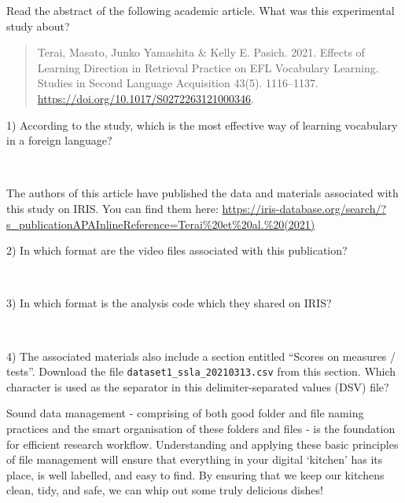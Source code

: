 \documentclass[
  letterpaper,
  DIV=11,
  numbers=noendperiod]{scrreprt}
\begin{document}
\begin{tcolorbox}[enhanced jigsaw, colback=white, colframe=quarto-callout-caution-color-frame, coltitle=black, toprule=.15mm, bottomtitle=1mm, arc=.35mm, left=2mm, opacityback=0, leftrule=.75mm, toptitle=1mm, titlerule=0mm, title=\textcolor{quarto-callout-caution-color}{\faFire}\hspace{0.5em}{Task}, opacitybacktitle=0.6, bottomrule=.15mm, colbacktitle=quarto-callout-caution-color!10!white, rightrule=.15mm, breakable]

Read the abstract of the following academic article. What was this
experimental study about?

\begin{quote}
Terai, Masato, Junko Yamashita \& Kelly E. Pasich. 2021. Effects of
Learning Direction in Retrieval Practice on EFL Vocabulary Learning.
Studies in Second Language Acquisition 43(5). 1116--1137.
\url{https://doi.org/10.1017/S0272263121000346}.
\end{quote}

1) According to the study, which is the most effective way of learning
vocabulary in a foreign language?

~

The authors of this article have published the data and materials
associated with this study on IRIS. You can find them here:
\url{https://iris-database.org/search/?s_publicationAPAInlineReference=Terai\%20et\%20al.\%20(2021)}

2) In which format are the video files associated with this publication?

~

3) In which format is the analysis code which they shared on IRIS?

~

4) The associated materials also include a section entitled ``Scores on
measures / tests''. Download the file
\texttt{dataset1\_ssla\_20210313.csv} from this section. Which character
is used as the separator in this delimiter-separated values (DSV) file?

\end{tcolorbox}

Sound data management - comprising of both good folder and file naming
practices and the smart organisation of these folders and files - is the
foundation for efficient research workflow. Understanding and applying
these basic principles of file management will ensure that everything in
your digital `kitchen' has its place, is well labelled, and easy to
find. By ensuring that we keep our kitchens clean, tidy, and safe, we
can whip out some truly delicious dishes!
\end{document}
